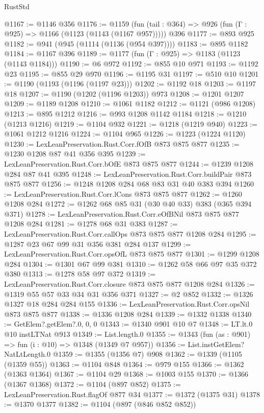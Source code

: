 \begin{lexlean}{RustStd}
\begin{coremodule}
@1167 := @1146 @356
@1176 := @1159
    (fun (tail : @364) => @926 (fun (Γ : @925) => @1166 (@1123 (@1143 (@1167 @957)))))
    @396
@1177 := @893 @925
@1182 := @941 (@945 (@1114 (@1136 (@954 @397))))
@1183 := @895 @1182
@1184 := @1167 @396
@1189 := @1177 (fun (Γ : @925) => @1183 (@1123 (@1143 @1184)))
@1190 := @6 @972
@1192 := @855 @10 @971
@1193 := @1192 @23
@1195 := @855 @29 @970
@1196 := @1195 @31
@1197 := @510 @10
@1201 := @1190 (@1193 (@1196 (@1197 @23)))
@1202 := @1192 @18
@1203 := @1197 @18
@1207 := @1190 (@1202 (@1196 @1203)) @973
@1208 := @1201 @1207
@1209 := @1189 @1208
@1210 := @1061 @1182
@1212 := @1121 (@986 @1208)
@1213 := @895 @1212
@1216 := @993 @1208 @1142 @1184
@1218 := @1210 (@1213 @1216)
@1219 := @1104 @932
@1221 := @1218 (@1219 @940)
@1223 := @1061 @1212 @1216
@1224 := @1104 @965
@1226 := @1223 (@1224 @1120)
@1230 := LexLeanPreservation.Rust.Corr.fOfB @873 @875 @877
@1235 := @1230 @1208 @87 @41 @356 @395
@1239 := LexLeanPreservation.Rust.Corr.bOfE @873 @875 @877
@1244 := @1239 @1208 @284 @87 @41 @395
@1248 := LexLeanPreservation.Rust.Corr.buildPair @873 @875 @877
@1256 := @1248 @1208 @284 @68 @83 @31 @40 @383 @394
@1260 := LexLeanPreservation.Rust.Corr.lCons @873 @875 @877
@1262 := @1260 @1208 @284
@1272 := @1262 @68 @85 @31 (@30 @40 @33) @383 (@365 @394 @371)
@1278 := LexLeanPreservation.Rust.Corr.eOfBNil @873 @875 @877 @1208 @284
@1281 := @1278 @68 @31 @383
@1287 := LexLeanPreservation.Rust.Corr.callOps @873 @875 @877 @1208 @284
@1295 := @1287 @23 @67 @99 @31 @356 @381 @284 @137
@1299 := LexLeanPreservation.Rust.Corr.opsOfL @873 @875 @877
@1301 := @1299 @1208 @284
@1304 := @1301 @67 @99 @381
@1310 := @1262 @58 @66 @97 @35 @372 @380
@1313 := @1278 @58 @97 @372
@1319 := LexLeanPreservation.Rust.Corr.closure @873 @875 @877 @1208 @284
@1326 := @1319 @55 @57 @33 @34 @31 @356 @371
@1327 := @2 @852
@1332 := @1326 @1327 @18 @284 @284 @155
@1336 := LexLeanPreservation.Rust.Corr.opsNil @873 @875 @877
@1338 := @1336 @1208 @284
@1339 := @1332 @1338
@1340 := GetElem?.getElem?.{0, 0, 0}
@1343 := @1340 @901 @10 @7
@1348 := LT.lt.{0} @10 instLTNat @913
@1349 := List.length.{0}
@1355 := @1343 (fun (as : @901) => fun (i : @10) => @1348 (@1349 @7 @957))
@1356 := List.instGetElem?NatLtLength.{0}
@1359 := @1355 (@1356 @7) @908
@1362 := @1339 (@1105 (@1359 @55))
@1363 := @1104 @848
@1364 := @979 @155
@1366 := @1362 (@1363 @1364)
@1367 := @1104 @29
@1368 := @1003 @155
@1370 := @1366 (@1367 @1368)
@1372 := @1104 (@897 @852)
@1375 := LexLeanPreservation.Rust.flagOf @877 @34
@1377 := @1372 (@1375 @31)
@1378 := @1370 @1377
@1382 := @1104 (@897 (@846 @852 @852))

\end{coremodule}
\end{lexlean}
